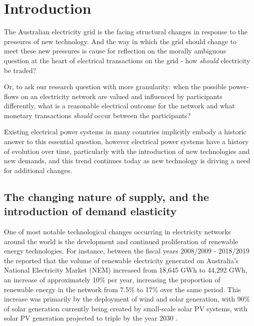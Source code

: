 \chapter{Introduction}
\label{cha:intro}

The Australian electricity grid is the facing structural changes in response to the pressures of new technology.
And the way in which the grid should change to meet these new pressures is cause for reflection on the morally ambiguous question at the heart of electrical transactions on the grid - how \textit{should} electricity be traded?

Or, to ask our research question with more granularity:
when the possible power-flows on an electricity network are valued and influenced by participants differently, 
what is a reasonable electrical outcome for the network and what monetary transactions \textit{should} occur between the participants?

Existing electrical power systems in many countries implicitly embody a historic answer to this essential question, however electrical power systems have a history of evolution over time, particularly with the introduction of new technologies and new demands, and this trend continues today as new technology is driving a need for additional changes.

\section{The changing nature of supply, and the introduction of demand elasticity}

One of most notable technological changes occurring in electricity networks around the world is the development and continued proliferation of renewable energy technologies.
For instance, between the fiscal years 2008/2009 - 2018/2019 the \cite{departmentoftheenvironmentenergy2018} reported that the volume of renewable electricity generated on Australia's National Electricity Market (NEM) increased from 18,645 GWh to 44,292 GWh, an increase of approximately 10\% per year, increasing the proportion of renewable energy in the network from 7.5\% to 17\% over the same period.
This increase was primarily by the deployment of wind and solar generation, with 90\% of solar generation currently being created by small-scale solar PV systems, with solar PV generation projected to triple by the year 2030 \citep{australianenergymarketoperatorlimited2018}.

